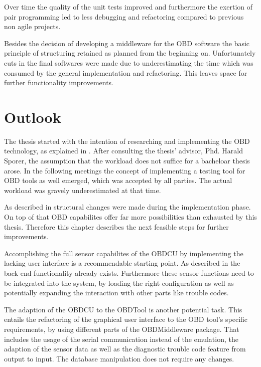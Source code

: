 Over time the quality of the unit tests improved and furthermore the exertion of pair programming led to less debugging and refactoring compared 
to previous non agile projects.

Besides the decision of developing a middleware for the OBD software the basic principle of structuring retained as planned from the beginning 
on. Unfortunately cuts in the final softwares were made due to underestimating the time which was consumed by the general implementation and 
refactoring. This leaves space for further functionality improvements.

\section{Outlook}
\label{sec:outlook}

The thesis started with the intention of researching and implementing the OBD technology, as explained in . After consulting 
the thesis' advisor, Phd. Harald Sporer, the assumption that the workload does not suffice for a bacheloar thesis arose. In the following meetings 
the concept of implementing a testing tool for OBD tools as well emerged, which was accepted by all parties. The actual workload was gravely 
underestimated at that time.

As described in  structural changes were made during the implementation phase. On top of that OBD capabilites 
offer far more possibilities than exhausted by this thesis. Therefore this chapter describes the next feasible steps for further improvements.

Accomplishing the full sensor capabilites of the OBDCU by implementing the lacking user interface is a recommendable starting point. 
As described in  the back-end functionality already exists. Furthermore these sensor functions need to be integrated into the system, by
loading the right configuration as well as potentially expanding the interaction with other parts like trouble codes. 

The adaption of the OBDCU to the OBDTool is another potential task. This entails the refactoring of the graphical user interface to the OBD tool's specific 
requirements, by using different parts of the OBDMiddleware package. That includes the usage of the serial communication instead of the emulation, the adaption of the sensor data 
as well as the diagnostic trouble code feature from output to input. The database manipulation does not require any changes. 

